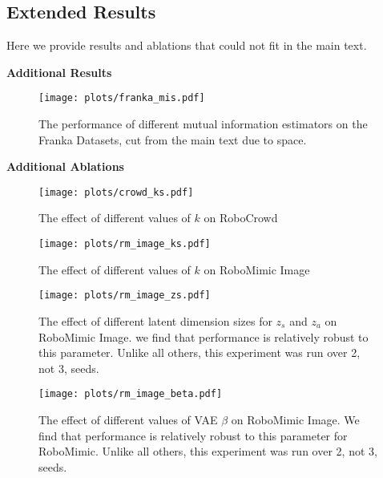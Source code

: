 
\subsection{Extended Results}
\label{app:results}
Here we provide results and ablations that could not fit in the main text.

\noindent \textbf{Additional Results}

\begin{figure}[ht]
    \centering
    \texttt{[image: plots/franka\_mis.pdf]}
    \vspace{-0.1in}
    \caption{The performance of different mutual information estimators on the Franka Datasets, cut from the main text due to space.}
\end{figure}

\noindent \textbf{Additional Ablations}

\begin{figure}[ht]
    \centering
    \texttt{[image: plots/crowd\_ks.pdf]}
    \vspace{-0.1in}
    \caption{The effect of different values of $k$ on RoboCrowd}
\end{figure}


\begin{figure}[ht]
    \centering
    \texttt{[image: plots/rm\_image\_ks.pdf]}
    \vspace{-0.1in}
    \caption{The effect of different values of $k$ on RoboMimic Image}
\end{figure}

\begin{figure}[ht]
    \centering
    \texttt{[image: plots/rm\_image\_zs.pdf]}
    \vspace{-0.1in}
    \caption{The effect of different latent dimension sizes for $z_s$ and $z_a$ on RoboMimic Image. we find that performance is relatively robust to this parameter. Unlike all others, this experiment was run over 2, not 3, seeds.}
\end{figure}

\begin{figure}[ht]
    \centering
    \texttt{[image: plots/rm\_image\_beta.pdf]}
    \vspace{-0.1in}
    \caption{The effect of different values of VAE $\beta$ on RoboMimic Image. We find that performance is relatively robust to this parameter for RoboMimic. Unlike all others, this experiment was run over 2, not 3, seeds.}
\end{figure}

